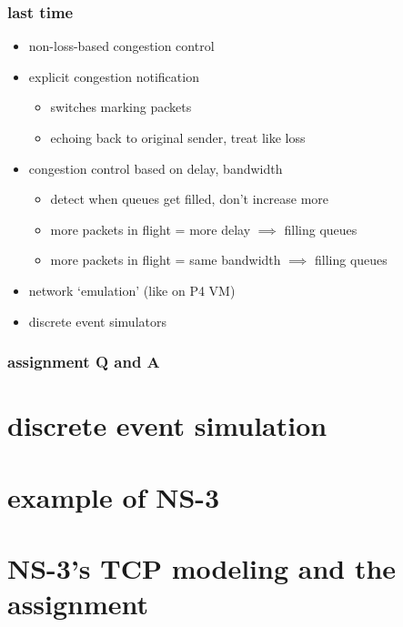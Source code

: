 \date{}
\title{}
\date{}

\begin{frame}
    \titlepage
\end{frame}

\begin{frame}
\frametitle{last time}
\begin{itemize}
\item non-loss-based congestion control
\item explicit congestion notification
    \begin{itemize}
    \item switches marking packets
    \item echoing back to original sender, treat like loss
    \end{itemize}
\item congestion control based on delay, bandwidth
    \begin{itemize}
    \item detect when queues get filled, don't increase more
    \item more packets in flight = more delay $\implies$ filling queues
    \item more packets in flight = same bandwidth $\implies$ filling queues
    \end{itemize}
\item network `emulation' (like on P4 VM)
\item discrete event simulators
\end{itemize}
\end{frame}


\begin{frame}
\frametitle{assignment Q and A}
\end{frame}

\section{discrete event simulation}


\section{example of NS-3}


\section{NS-3's TCP modeling and the assignment}


